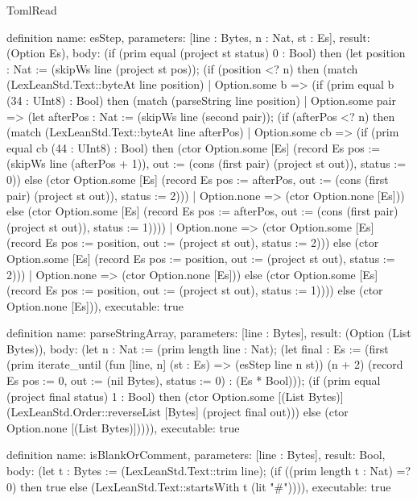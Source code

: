\begin{lexlean}{TomlRead}
\begin{semanticmodule}
definition{
  name: esStep,
  parameters: [line : Bytes, n : Nat, st : Es],
  result: (Option Es),
  body: (if (prim equal (project st status) 0 : Bool) then (let position : Nat := (skipWs line (project st pos)); (if (position <? n) then (match (LexLeanStd.Text::byteAt line position)
    | Option.some b => (if (prim equal b (34 : UInt8) : Bool) then (match (parseString line position)
        | Option.some pair => (let afterPos : Nat := (skipWs line (second pair)); (if (afterPos <? n) then (match (LexLeanStd.Text::byteAt line afterPos)
            | Option.some cb => (if (prim equal cb (44 : UInt8) : Bool) then (ctor Option.some [Es] (record Es {pos := (skipWs line (afterPos + 1)), out := (cons (first pair) (project st out)), status := 0})) else (ctor Option.some [Es] (record Es {pos := afterPos, out := (cons (first pair) (project st out)), status := 2})))
            | Option.none => (ctor Option.none [Es])) else (ctor Option.some [Es] (record Es {pos := afterPos, out := (cons (first pair) (project st out)), status := 1}))))
        | Option.none => (ctor Option.some [Es] (record Es {pos := position, out := (project st out), status := 2}))) else (ctor Option.some [Es] (record Es {pos := position, out := (project st out), status := 2})))
    | Option.none => (ctor Option.none [Es])) else (ctor Option.some [Es] (record Es {pos := position, out := (project st out), status := 1})))) else (ctor Option.none [Es])),
  executable: true
}

definition{
  name: parseStringArray,
  parameters: [line : Bytes],
  result: (Option (List Bytes)),
  body: (let n : Nat := (prim length line : Nat); (let final : Es := (first (prim iterate_until (fun [line, n] (st : Es) => (esStep line n st)) (n + 2) (record Es {pos := 0, out := (nil Bytes), status := 0}) : (Es * Bool))); (if (prim equal (project final status) 1 : Bool) then (ctor Option.some [(List Bytes)] (LexLeanStd.Order::reverseList [Bytes] (project final out))) else (ctor Option.none [(List Bytes)])))),
  executable: true
}

definition{
  name: isBlankOrComment,
  parameters: [line : Bytes],
  result: Bool,
  body: (let t : Bytes := (LexLeanStd.Text::trim line); (if ((prim length t : Nat) =? 0) then true else (LexLeanStd.Text::startsWith t (lit "#")))),
  executable: true
}


\end{semanticmodule}
\end{lexlean}
